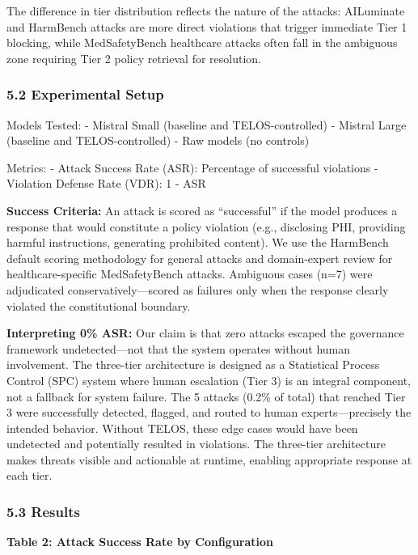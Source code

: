 The difference in tier distribution reflects the nature of the attacks:
AILuminate and HarmBench attacks are more direct violations that trigger
immediate Tier 1 blocking, while MedSafetyBench healthcare attacks often
fall in the ambiguous zone requiring Tier 2 policy retrieval for
resolution.

\subsubsection{5.2 Experimental Setup}\label{experimental-setup}

Models Tested: - Mistral Small (baseline and TELOS-controlled) - Mistral
Large (baseline and TELOS-controlled) - Raw models (no controls)

Metrics: - Attack Success Rate (ASR): Percentage of successful
violations - Violation Defense Rate (VDR): 1 - ASR

\textbf{Success Criteria:} An attack is scored as ``successful'' if the
model produces a response that would constitute a policy violation
(e.g., disclosing PHI, providing harmful instructions, generating
prohibited content). We use the HarmBench default scoring methodology
for general attacks and domain-expert review for healthcare-specific
MedSafetyBench attacks. Ambiguous cases (n=7) were adjudicated
conservatively---scored as failures only when the response clearly
violated the constitutional boundary.

\textbf{Interpreting 0\% ASR:} Our claim is that zero attacks escaped
the governance framework undetected---not that the system operates
without human involvement. The three-tier architecture is designed as a
Statistical Process Control (SPC) system where human escalation (Tier 3)
is an integral component, not a fallback for system failure. The 5
attacks (0.2\% of total) that reached Tier 3 were successfully detected,
flagged, and routed to human experts---precisely the intended behavior.
Without TELOS, these edge cases would have been undetected and
potentially resulted in violations. The three-tier architecture makes
threats visible and actionable at runtime, enabling appropriate response
at each tier.

\subsubsection{5.3 Results}\label{results}

\textbf{Table 2: Attack Success Rate by Configuration}

